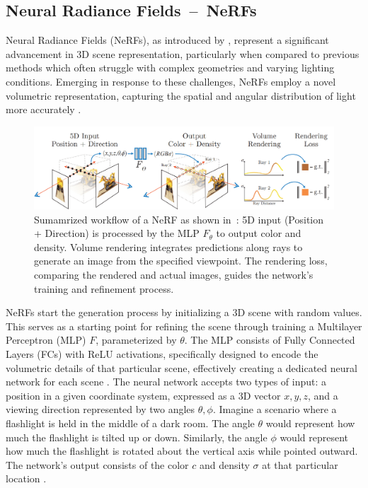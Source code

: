 \subsection{Neural Radiance Fields~--~NeRFs}\label{NeRF}

Neural Radiance Fields (NeRFs), as introduced by \citeauthor{mildenhallNERF}, represent a significant advancement in 3D scene representation, particularly when compared to previous methods which often struggle with complex geometries and varying lighting conditions. Emerging in response to these challenges, NeRFs employ a novel volumetric representation, capturing the spatial and angular distribution of light more accurately \citep{mildenhallNERF}.

\begin{figure}[ht]
    \centering
      \includegraphics[width=1\columnwidth]{figures/basics/NeRF_Fig_2_Mildenhall.png}
      \caption{Sumamrized workflow of a NeRF as shown in~\citep{mildenhallNERF}: 5D input (Position + Direction) is processed by the MLP \(F_\theta\) to output color and density. Volume rendering integrates predictions along rays to generate an image from the specified viewpoint. The rendering loss, comparing the rendered and actual images, guides the network's training and refinement process.}\label{fig:figureNeRF}
\end{figure}

NeRFs start the generation process by initializing a 3D scene with random values. This serves as a starting point for refining the scene through training a Multilayer Perceptron (MLP) \(F\), parameterized by \(\theta\). The MLP consists of Fully Connected Layers (FCs) with ReLU activations, specifically designed to encode the volumetric details of that particular scene, effectively creating a dedicated neural network for each scene \citep{mildenhallNERF}. The neural network accepts two types of input: a position in a given coordinate system, expressed as a 3D vector \(x, y, z\), and a viewing direction represented by two angles \( \theta, \phi \). Imagine a scenario where a flashlight is held in the middle of a dark room. The angle \( \theta \) would represent how much the flashlight is tilted up or down. Similarly, the angle \( \phi \) would represent how much the flashlight is rotated about the vertical axis while pointed outward. The network's output consists of the color \(c\) and density \( \sigma \) at that particular location \citep{mildenhallNERF}. 


